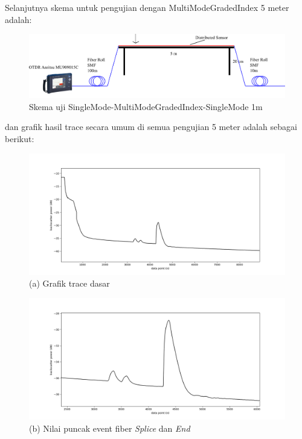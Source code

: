 \documentclass[12pt]{article}
\begin{document}
	Selanjutnya skema untuk pengujian dengan MultiModeGradedIndex 5 meter adalah:
	
	\begin{figure}[!ht]
		\centering
		\captionsetup{justification=centering}
		\includegraphics[width=0.7\linewidth]{images/Bab_4/uji_5m}
		\caption[Trace SMF-SMF]{\small{Skema uji SingleMode-MultiModeGradedIndex-SingleMode 1m}}
	\end{figure}
	
	dan grafik hasil trace secara umum di semua pengujian 5 meter adalah sebagai berikut:
	
	\begin{figure}[!ht]
		\centering
		\captionsetup{justification=centering}
		\includegraphics[width=\textwidth]{images/Bab_4/Bab_4_5e1}	
		\caption{\small{(a) Grafik trace dasar}}
	\end{figure}
	
	\newpage
	\begin{figure}[!ht]
		\centering
		\captionsetup{justification=centering}
		\includegraphics[width=\textwidth]{images/Bab_4/Bab_4_5e2}	
		\caption{\small{(b) Nilai puncak event fiber \textit{Splice} dan \textit{End}}}
	\end{figure}
	
\end{document}
